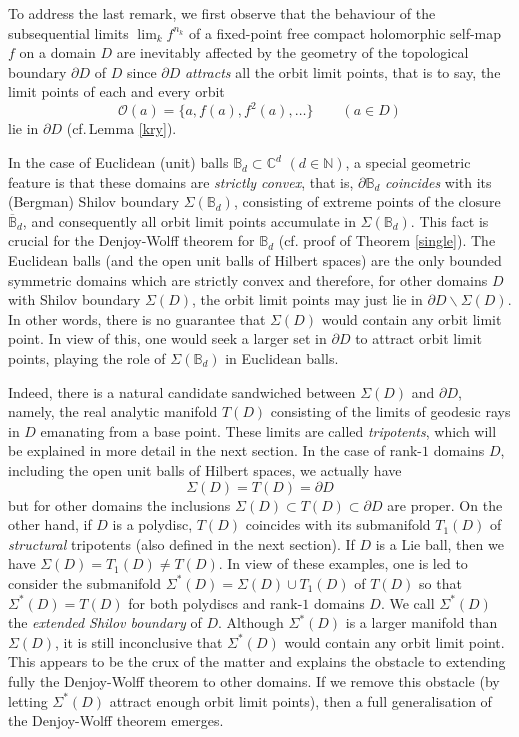\documentclass[12pt, twoside]{article}
\theoremstyle{definition}
\numberwithin{equation}{section}
\begin{document}
To address the last remark, we first observe that the behaviour of the subsequential limits $\lim_k f^{n_k}$ of
a fixed-point free compact holomorphic self-map $f$ on a domain
$D$ are inevitably affected by  the geometry of the topological boundary $\partial D$ of $D$
since $\partial D$ {\it attracts} all the orbit  limit points, that is to say, the limit points  of each and every
orbit
$$ \mathcal{O}(a)= \{a, f(a), f^2(a), \ldots\} \qquad ( a\in {D})$$
 lie in $\partial {D}$ (cf.\,Lemma \ref{kry}).

In the case of Euclidean (unit) balls $\mathbb{B}_d \subset \mathbb{C}^d$ $(d\in \mathbb{N})$,
 a special  geometric feature is that  these domains are {\it strictly convex},
that is, $\partial \mathbb{B}_d$
 {\it coincides} with its (Bergman) Shilov boundary $\Sigma(\mathbb{B}_d)$,
consisting of  extreme points of the closure $\overline{\mathbb{B}}_d$,
and consequently all orbit limit points accumulate in $\Sigma(\mathbb{B}_d)$.
This fact is crucial for the Denjoy-Wolff theorem for $\mathbb{B}_d$ (cf. proof of Theorem \ref{single}).
 The Euclidean balls (and the open unit balls of Hilbert spaces)
are the only bounded symmetric domains which are strictly convex and therefore,  for other domains $D$
with Shilov boundary $\Sigma(D)$, the orbit limit points may
just lie in $\partial {D}\backslash \Sigma(D)$. In other words, there is no guarantee that
$\Sigma(D)$ would contain any orbit limit point.
In view of this, one would seek
 a larger set in $\partial D$ to attract orbit limit points, playing the role of $\Sigma(\mathbb{B}_d)$ in Euclidean balls.


Indeed, there is  a natural candidate sandwiched between $\Sigma(D)$ and $\partial D$, namely, the
real analytic manifold $T(D)$ consisting of the limits
of geodesic rays in $D$ emanating from a base point. These limits  are called {\it  tripotents}, which will be explained
in more detail in the next section. In the case of rank-$1$ domains $D$, including the open unit balls of Hilbert spaces, we actually have
$$\Sigma(D) = T(D)=\partial D$$ but for other domains
the inclusions $ \Sigma(D) \subset T(D) \subset \partial D$ are proper. On the other hand, if $D$ is a polydisc,
$T(D)$ coincides with its submanifold $T_1(D)$ of {\it structural} tripotents (also defined in the next section). If $D$ is a Lie ball,
then we have $\Sigma(D)=T_1(D)\neq T(D)$. In view of these examples,
one is led to consider the  submanifold $\Sigma^*(D) = \Sigma(D) \cup T_1(D)$ of $T(D)$  so that
$\Sigma^*(D)=T(D)$ for both polydiscs and rank-$1$ domains $D$. We call $\Sigma^*(D)$ the
{\it extended Shilov boundary} of $ D$.
 Although $\Sigma^*(D)$ is a larger manifold than $\Sigma(D)$,
it is still inconclusive that $\Sigma^*(D)$  would contain any orbit limit point.
This appears to be the crux of the matter and explains the obstacle to extending fully the Denjoy-Wolff theorem
 to other domains. If we remove this obstacle (by letting $\Sigma^*(D)$ attract enough orbit limit points),
 then a full generalisation of the Denjoy-Wolff theorem
emerges.
\end{document}
